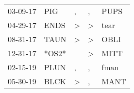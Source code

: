 \begin{supertabular}{p{0.07\textwidth}p{0.06\textwidth}p{0.02\textwidth}p{0.02\textwidth}p{0.06\textwidth}}
          03-09-17\textsuperscript{} &   PIG\textsuperscript{} &                , &                , &           PUPS\textsuperscript{} \\
          04-29-17\textsuperscript{} &  ENDS\textsuperscript{} &     \textgreater &     \textgreater &           tear\textsuperscript{} \\
          08-31-17\textsuperscript{} &  TAUN\textsuperscript{} &     \textgreater &     \textgreater &           OBLI\textsuperscript{} \\
          12-31-17\textsuperscript{} &                   *OS2* &                  &     \textgreater &           MITT\textsuperscript{} \\
          02-15-19\textsuperscript{} &  PLUN\textsuperscript{} &                , &                , &           fman\textsuperscript{} \\
          05-30-19\textsuperscript{} &  BLCK\textsuperscript{} &     \textgreater &                , &           MANT\textsuperscript{} \\
\end{supertabular}
